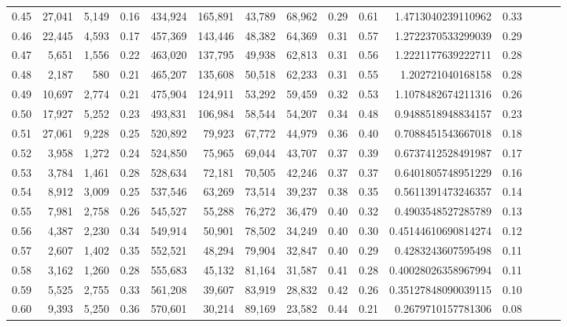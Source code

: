 \begin{tabular}{rrrrrrrrrrrrrrr}
0.45 &  27,041 &  5,149 &  0.16 &  434,924 &  165,891 &   43,789 &   68,962 &  0.29 &  0.61 &      1.4713040239110962 &      0.33 \\
0.46 &  22,445 &  4,593 &  0.17 &  457,369 &  143,446 &   48,382 &   64,369 &  0.31 &  0.57 &      1.2722370533299039 &      0.29 \\
0.47 &   5,651 &  1,556 &  0.22 &  463,020 &  137,795 &   49,938 &   62,813 &  0.31 &  0.56 &      1.2221177639222711 &      0.28 \\
0.48 &   2,187 &    580 &  0.21 &  465,207 &  135,608 &   50,518 &   62,233 &  0.31 &  0.55 &       1.202721040168158 &      0.28 \\
0.49 &  10,697 &  2,774 &  0.21 &  475,904 &  124,911 &   53,292 &   59,459 &  0.32 &  0.53 &      1.1078482674211316 &      0.26 \\
0.50 &  17,927 &  5,252 &  0.23 &  493,831 &  106,984 &   58,544 &   54,207 &  0.34 &  0.48 &      0.9488518948834157 &      0.23 \\
0.51 &  27,061 &  9,228 &  0.25 &  520,892 &   79,923 &   67,772 &   44,979 &  0.36 &  0.40 &      0.7088451543667018 &      0.18 \\
0.52 &   3,958 &  1,272 &  0.24 &  524,850 &   75,965 &   69,044 &   43,707 &  0.37 &  0.39 &      0.6737412528491987 &      0.17 \\
0.53 &   3,784 &  1,461 &  0.28 &  528,634 &   72,181 &   70,505 &   42,246 &  0.37 &  0.37 &      0.6401805748951229 &      0.16 \\
0.54 &   8,912 &  3,009 &  0.25 &  537,546 &   63,269 &   73,514 &   39,237 &  0.38 &  0.35 &      0.5611391473246357 &      0.14 \\
0.55 &   7,981 &  2,758 &  0.26 &  545,527 &   55,288 &   76,272 &   36,479 &  0.40 &  0.32 &      0.4903548527285789 &      0.13 \\
0.56 &   4,387 &  2,230 &  0.34 &  549,914 &   50,901 &   78,502 &   34,249 &  0.40 &  0.30 &     0.45144610690814274 &      0.12 \\
0.57 &   2,607 &  1,402 &  0.35 &  552,521 &   48,294 &   79,904 &   32,847 &  0.40 &  0.29 &      0.4283243607595498 &      0.11 \\
0.58 &   3,162 &  1,260 &  0.28 &  555,683 &   45,132 &   81,164 &   31,587 &  0.41 &  0.28 &     0.40028026358967994 &      0.11 \\
0.59 &   5,525 &  2,755 &  0.33 &  561,208 &   39,607 &   83,919 &   28,832 &  0.42 &  0.26 &     0.35127848090039115 &      0.10 \\
0.60 &   9,393 &  5,250 &  0.36 &  570,601 &   30,214 &   89,169 &   23,582 &  0.44 &  0.21 &      0.2679710157781306 &      0.08 \\

\end{tabular}
